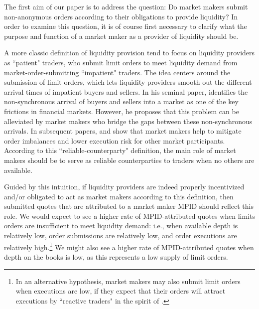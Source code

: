 \documentclass{article}
\begin{document}
The first aim of our paper is to address the question: Do market makers submit non-anonymous orders according to their obligations to provide liquidity? In order to examine this question, it is of course first necessary to clarify what the purpose and function of a market maker as a provider of liquidity should be.

A more classic definition of liquidity provision tend to focus on liquidity providers as ``patient" traders, who submit limit orders to meet liquidity demand from market-order-submitting ``impatient" traders. The idea centers around the submission of limit orders, which lets liquidity providers smooth out the different arrival times of impatient buyers and sellers. In his seminal paper, \citet{demsetz1968cost} identifies the non-synchronous arrival of buyers and sellers into a market as one of the key frictions in financial markets. However, he proposes that this problem can be alleviated by market makers who bridge the gaps between these non-synchronous arrivals. In subsequent papers, \citet{garbade1979structural} and \citet{grossman1988liquidity} show that market makers help to mitigate order imbalances and lower execution risk for other market participants. According to this ``reliable-counterparty" definition, the main role of market makers should be to serve as reliable counterparties to traders when no others are available.

Guided by this intuition, if liquidity providers are indeed properly incentivized and/or obligated to act as market makers according to this definition, then submitted quotes that are attributed to a market maker MPID should reflect this role. We would expect to see a higher rate of MPID-attributed quotes when limits orders are insufficient to meet liquidity demand: i.e., when available depth is relatively low, order submissions are relatively low, and order executions are relatively high.\footnote{In an alternative hypothesis, market makers may also submit limit orders when executions are low, if they expect that their orders will attract executions by ``reactive traders" in the spirit of \citet{harris1997order}.} We might also see a higher rate of MPID-attributed quotes when depth on the books is low, as this represents a low supply of limit orders. %
\end{document}

